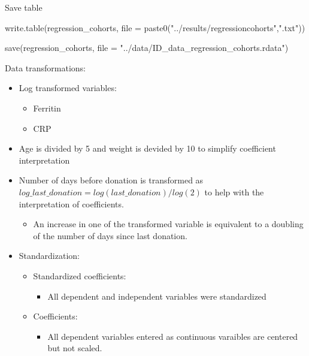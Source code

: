 \documentclass[
]{article}
\newenvironment{Shaded}{\begin{snugshade}}{\end{snugshade}}
\newcommand{\AttributeTok}[1]{\textcolor[rgb]{0.77,0.63,0.00}{#1}}
\newcommand{\FunctionTok}[1]{\textcolor[rgb]{0.00,0.00,0.00}{#1}}
\newcommand{\NormalTok}[1]{#1}
\newcommand{\StringTok}[1]{\textcolor[rgb]{0.31,0.60,0.02}{#1}}
\providecommand{\tightlist}{%
  \setlength{\itemsep}{0pt}\setlength{\parskip}{0pt}}
\begin{document}
Save table

\begin{Shaded}
\begin{Highlighting}[]
\FunctionTok{write.table}\NormalTok{(regression\_cohorts, }\AttributeTok{file =} \FunctionTok{paste0}\NormalTok{(}\StringTok{"../results/regressioncohorts"}\NormalTok{,}\StringTok{".txt"}\NormalTok{))}

\FunctionTok{save}\NormalTok{(regression\_cohorts, }\AttributeTok{file =} \StringTok{"../data/ID\_data\_regression\_cohorts.rdata"}\NormalTok{)}
\end{Highlighting}
\end{Shaded}

Data transformations:

\begin{itemize}
\tightlist
\item
  Log transformed variables:

  \begin{itemize}
  \tightlist
  \item
    Ferritin
  \item
    CRP
  \end{itemize}
\item
  Age is divided by 5 and weight is devided by 10 to simplify
  coefficient interpretation
\item
  Number of days before donation is transformed as
  \(log\_last\_donation = log(last\_donation)/log(2)\) to help with the
  interpretation of coefficients.

  \begin{itemize}
  \tightlist
  \item
    An increase in one of the transformed variable is equivalent to a
    doubling of the number of days since last donation.
  \end{itemize}
\item
  Standardization:

  \begin{itemize}
  \tightlist
  \item
    Standardized coefficients:

    \begin{itemize}
    \tightlist
    \item
      All dependent and independent variables were standardized
    \end{itemize}
  \item
    Coefficients:

    \begin{itemize}
    \tightlist
    \item
      All dependent variables entered as continuous varaibles are
      centered but not scaled.
    \end{itemize}
  \end{itemize}
\end{itemize}
\end{document}
